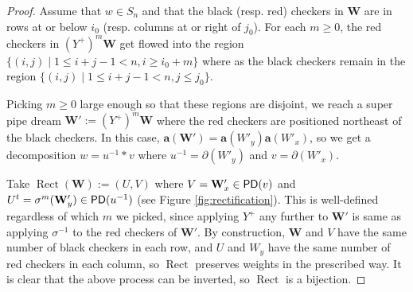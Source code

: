 \documentclass[11pt,reqno]{amsart} %
\newcommand{\bfW}{\mathbf{W}}
\DeclareMathOperator{\PD}{\sf{PD}}
\DeclareMathOperator{\Rect}{Rect} %
\theoremstyle{definition}
\begin{document}
\begin{proof}
Assume that $w\in S_n$ and that the black (resp. red) checkers in $\bfW$ are in rows at or below $i_0$ (resp. columns at or right of $j_0$).
For each $m\geq 0$, the red checkers in $(Y^+)^m\bfW$ get flowed into the region $\{(i,j) \mid 1\leq i+j-1< n,i\geq i_0+m\}$ where as the black checkers remain in the region $\{(i,j) \mid 1\leq i+j-1<n, j\leq j_0\}$.

Picking $m\geq 0$ large enough so that these regions are disjoint, we reach a super pipe dream $\bfW' := (Y^+)^m\bfW$ where the red checkers are positioned northeast of the black checkers.
In this case, $\mathbf{a}(\bfW') = \mathbf{a}(W'_y)\mathbf{a}(W'_x)$, so we get a decomposition $w = u^{-1} * v$ where $u^{-1} = \partial(W'_y)$ and $v = \partial(W'_x)$.

Take $\Rect(\bfW) := (U,V)$ where $V = \bfW'_x\in \PD(v)$ and $U^t = \sigma^m(\bfW'_y) \in \PD(u^{-1})$ (see Figure \ref{fig:rectification}).
This is well-defined regardless of which $m$ we picked, since applying $Y^+$ any further to $\bfW'$ is same as applying $\sigma^{-1}$ to the red checkers of $\bfW'$.
By construction, $\bfW$ and $V$ have the same number of black checkers in each row, and $U$ and $W_y$ have the same number of red checkers in each column, so $\Rect$ preserves weights in the prescribed way.
It is clear that the above process can be inverted, so $\Rect$ is a bijection.
\end{proof}
\end{document}
